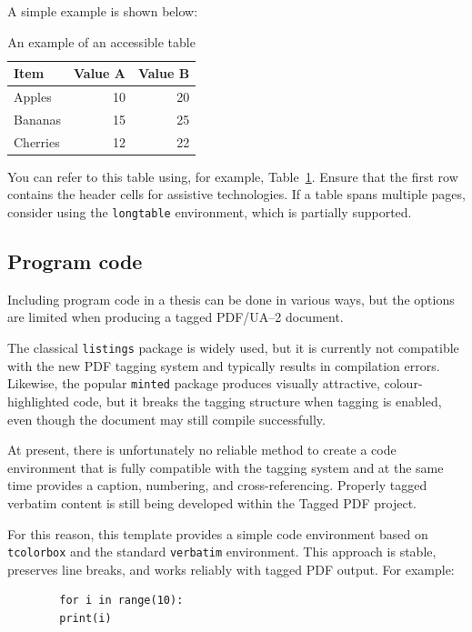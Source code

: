 A simple example is shown below:

\begin{table}[ht]
	\centering
	\begin{tabular}{l r r}
		\hline
		\textbf{Item} & \textbf{Value A} & \textbf{Value B} \\
		\hline
		Apples  & 10 & 20 \\
		Bananas & 15 & 25 \\
		Cherries & 12 & 22 \\
		\hline
	\end{tabular}
	\caption{An example of an accessible table}
	\label{tab:example}
\end{table}

You can refer to this table using, for example, Table~\ref{tab:example}.
Ensure that the first row contains the header cells for assistive technologies.
If a table spans multiple pages, consider using the \texttt{longtable}
environment, which is partially supported.

\subsection{Program code}

Including program code in a thesis can be done in various ways, but the options
are limited when producing a tagged PDF/UA--2 document.

The classical \texttt{listings} package is widely used, but it is currently not
compatible with the new PDF tagging system and typically results in compilation
errors.  
Likewise, the popular \texttt{minted} package produces visually attractive,
colour-highlighted code, but it breaks the tagging structure when tagging is
enabled, even though the document may still compile successfully.

At present, there is unfortunately no reliable method to create a code
environment that is fully compatible with the tagging system and at the same
time provides a caption, numbering, and cross-referencing.  Properly tagged
verbatim content is still being developed within the Tagged PDF project.

For this reason, this template provides a simple code environment based on
\texttt{tcolorbox} and the standard \texttt{verbatim} environment.  This
approach is stable, preserves line breaks, and works reliably with tagged PDF
output.  For example:

\begin{codebox}
	\begin{verbatim}
		for i in range(10):
		print(i)
	\end{verbatim}
\end{codebox}

